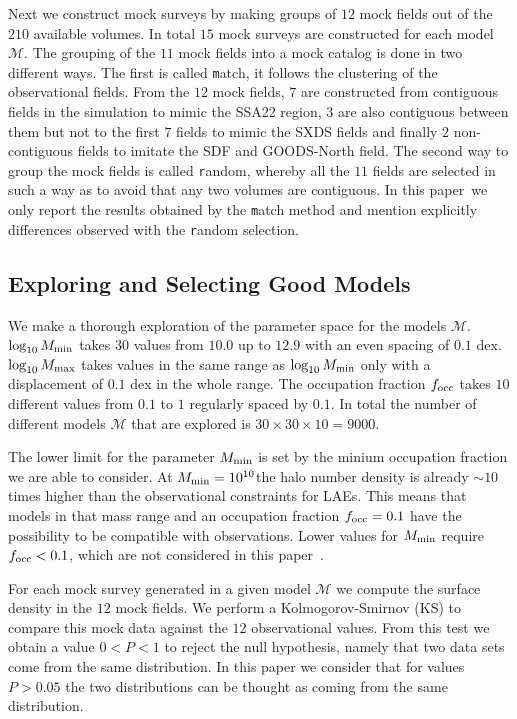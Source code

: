 \documentclass[usenatbib]{mn2e}
\newcommand{\documentname}{paper~}
\newcommand{\hMsun}{{\ifmmode{h^{-1}{\rm
        {M_{\odot}}}}\else{$h^{-1}{\rm{M_{\odot}}}$}\fi}}
\begin{document}
Next we construct mock surveys by making groups of $12$ mock fields
out of the $210$ available volumes. In total $15$ mock surveys are
constructed for each model $\mathcal{M}$. The grouping of the $11$
mock fields into a mock catalog is done in two different ways. The
first is called {\texttt match}, it follows the clustering of the
observational fields. From the $12$ mock fields, $7$ are constructed
from contiguous fields in the simulation to mimic the SSA22 region,
$3$ are also contiguous between them but not to the first $7$ fields
to mimic the SXDS fields and finally $2$ non-contiguous fields to
imitate the SDF and GOODS-North field.  The second way to group the
mock fields is called {\texttt   random}, whereby all the $11$ fields
are selected in such a way as to avoid that any two volumes are
contiguous. In this \documentname we only report the results obtained
by the {\texttt match} method and mention explicitly differences
observed with the {\texttt random} selection. 





\subsection{Exploring and Selecting Good Models}

We make a thorough exploration of the parameter space for the models
${\mathcal M}$. $\log_{10} M_{\rm min}$ takes $30$ values from $10.0$ up
to $12.9$ with an even spacing of $0.1$ dex. $\log_{10} M_{\rm max}$
takes values in the same range as $\log_{10}M_{\rm min}$ only with a
displacement of $0.1$ dex in the whole range. The occupation fraction
$f_{\rm occ}$ takes $10$ different values from $0.1$ to $1$ regularly
spaced by $0.1$. In total the number of different models ${\mathcal
  M}$ that are explored is $30 \times 30 \times 10 = 9000$. 


The lower limit for the parameter $M_{\rm min}$ is set by the minium
occupation fraction we are able to consider. At $M_{\rm
  min}=10^{10}$\hMsun the halo number density is already $\sim 10$
times higher than the observational constraints for LAEs. This means
that models in that mass range and an occupation fraction $f_{\rm
  occ}=0.1$ have the possibility to be compatible with observations. Lower
values for $M_{\rm min}$ require $f_{\rm occ}<0.1$, which are not
considered in this \documentname. 

For each mock survey generated in a given model ${\mathcal M}$ we
compute the surface density in the $12$ mock fields. We perform a
Kolmogorov-Smirnov (KS) to compare this mock data against the $12$
observational values. From this test we obtain a value $0<P<1$ to
reject the null hypothesis, namely that two data sets come from the
same distribution. In this paper we consider that for values $P>0.05$
the two distributions can be thought as coming from the same
distribution.
\end{document}
